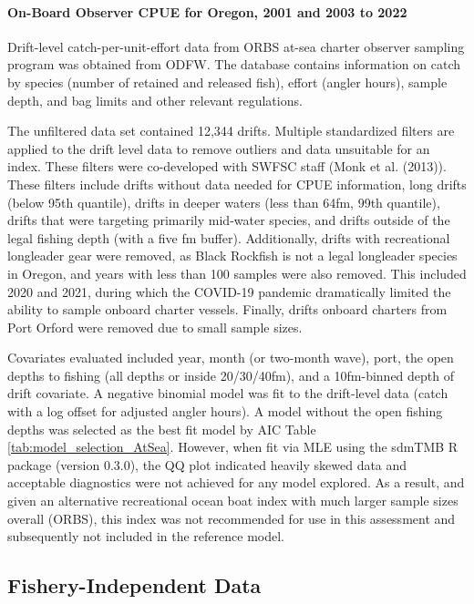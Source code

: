 \documentclass[11pt,
  english,
  letterpaper,
]{article}
\begin{document}
\hypertarget{on-board-observer-cpue-for-oregon-2001-and-2003-to-2022}{%
\paragraph{On-Board Observer CPUE for Oregon, 2001 and 2003 to 2022}\label{on-board-observer-cpue-for-oregon-2001-and-2003-to-2022}}

Drift-level catch-per-unit-effort data from ORBS at-sea charter observer sampling program was obtained from ODFW. The database contains information on catch by species (number of retained and released fish), effort (angler hours), sample depth, and bag limits and other relevant regulations.

The unfiltered data set contained 12,344 drifts. Multiple standardized filters are applied to the drift level data to remove outliers and data unsuitable for an index. These filters were co-developed with SWFSC staff (Monk et al. (2013)). These filters include drifts without data needed for CPUE information, long drifts (below 95th quantile), drifts in deeper waters (less than 64fm, 99th quantile), drifts that were targeting primarily mid-water species, and drifts outside of the legal fishing depth (with a five fm buffer). Additionally, drifts with recreational longleader gear were removed, as Black Rockfish is not a legal longleader species in Oregon, and years with less than 100 samples were also removed. This included 2020 and 2021, during which the COVID-19 pandemic dramatically limited the ability to sample onboard charter vessels. Finally, drifts onboard charters from Port Orford were removed due to small sample sizes.

Covariates evaluated included year, month (or two-month wave), port, the open depths to fishing (all depths or inside 20/30/40fm), and a 10fm-binned depth of drift covariate. A negative binomial model was fit to the drift-level data (catch with a log offset for adjusted angler hours). A model without the open fishing depths was selected as the best fit model by AIC Table \ref{tab:model_selection_AtSea}. However, when fit via MLE using the sdmTMB R package (version 0.3.0), the QQ plot indicated heavily skewed data and acceptable diagnostics were not achieved for any model explored. As a result, and given an alternative recreational ocean boat index with much larger sample sizes overall (ORBS), this index was not recommended for use in this assessment and subsequently not included in the reference model.

\hypertarget{fishery-independent-data}{%
\subsection{Fishery-Independent Data}\label{fishery-independent-data}}
\end{document}
